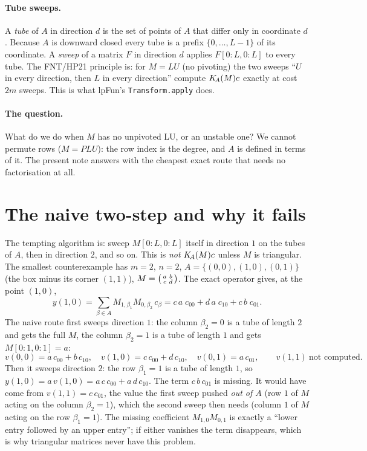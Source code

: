 \documentclass[11pt]{article}
\begin{document}
\paragraph{Tube sweeps.} A \emph{tube} of $A$ in direction $d$ is the set of points of $A$ that differ only in
coordinate $d$. Because $A$ is downward closed every tube is a prefix $\{0,\dots,L-1\}$ of its coordinate. A
\emph{sweep} of a matrix $F$ in direction $d$ applies $F[0{:}L,0{:}L]$ to every tube. The FNT/HP21 principle
is: for $M=LU$ (no pivoting) the two sweeps ``$U$ in every direction, then $L$ in every direction'' compute
$K_{\!A}(M)c$ exactly at cost $2m$ sweeps. This is what lpFun's \texttt{Transform.apply} does.

\paragraph{The question.} What do we do when $M$ has no unpivoted LU, or an unstable one? We cannot permute
rows ($M=PLU$): the row index is the degree, and $A$ is defined in terms of it. The present note answers with
the cheapest exact route that needs no factorisation at all.

\section{The naive two-step and why it fails}\label{sec:naive}
The tempting algorithm is: sweep $M[0{:}L,0{:}L]$ itself in direction $1$ on the tubes of $A$, then in direction
$2$, and so on. This is \emph{not} $K_{\!A}(M)c$ unless $M$ is triangular. The smallest counterexample has $m=2$,
$n=2$, $A=\{(0,0),(1,0),(0,1)\}$ (the box minus its corner $(1,1)$), $M=\begin{psmallmatrix}a&b\\ c&d\end{psmallmatrix}$.
The exact operator gives, at the point $(1,0)$,
\[
 y(1,0)=\sum_{\beta\in A} M_{1,\beta_1}M_{0,\beta_2}\,c_\beta
       = c\,a\;c_{00}+d\,a\;c_{10}+c\,b\;c_{01}.
\]
The naive route first sweeps direction $1$: the column $\beta_2=0$ is a tube of length $2$ and gets the full
$M$, the column $\beta_2=1$ is a tube of length $1$ and gets $M[0{:}1,0{:}1]=a$:
\[
 v(0,0)=a\,c_{00}+b\,c_{10},\quad v(1,0)=c\,c_{00}+d\,c_{10},\quad v(0,1)=a\,c_{01},\qquad v(1,1)\ \text{not computed}.
\]
Then it sweeps direction $2$: the row $\beta_1=1$ is a tube of length $1$, so $y(1,0)=a\,v(1,0)=a\,c\,c_{00}+a\,d\,c_{10}$.
The term $c\,b\,c_{01}$ is missing. It would have come from $v(1,1)=c\,c_{01}$, the value the first sweep pushed
\emph{out of $A$} (row $1$ of $M$ acting on the column $\beta_2=1$), which the second sweep then needs (column $1$
of $M$ acting on the row $\beta_1=1$). The missing coefficient $M_{1,0}M_{0,1}$ is exactly a
``lower entry followed by an upper entry''; if either vanishes the term disappears, which is why triangular
matrices never have this problem.
\end{document}
